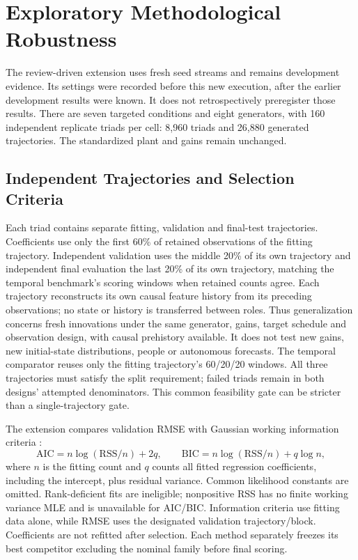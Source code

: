 \section{Exploratory Methodological Robustness}

The review-driven extension uses fresh seed streams and remains development evidence. Its settings were recorded before this new execution, after the earlier development results were known. It does not retrospectively preregister those results. There are seven targeted conditions and eight generators, with 160 independent replicate triads per cell: 8,960 triads and 26,880 generated trajectories. The standardized plant and gains remain unchanged.

\subsection{Independent Trajectories and Selection Criteria}

Each triad contains separate fitting, validation and final-test trajectories. Coefficients use only the first 60\% of retained observations of the fitting trajectory. Independent validation uses the middle 20\% of its own trajectory and independent final evaluation the last 20\% of its own trajectory, matching the temporal benchmark's scoring windows when retained counts agree. Each trajectory reconstructs its own causal feature history from its preceding observations; no state or history is transferred between roles. Thus generalization concerns fresh innovations under the same generator, gains, target schedule and observation design, with causal prehistory available. It does not test new gains, new initial-state distributions, people or autonomous forecasts. The temporal comparator reuses only the fitting trajectory's 60/20/20 windows. All three trajectories must satisfy the split requirement; failed triads remain in both designs' attempted denominators. This common feasibility gate can be stricter than a single-trajectory gate.

The extension compares validation RMSE with Gaussian working information criteria \parencite{akaike1974newlook,schwarz1978dimension}:
\[
\mathrm{AIC}=n\log(\mathrm{RSS}/n)+2q,
\qquad
\mathrm{BIC}=n\log(\mathrm{RSS}/n)+q\log n,
\]
where $n$ is the fitting count and $q$ counts all fitted regression coefficients, including the intercept, plus residual variance. Common likelihood constants are omitted. Rank-deficient fits are ineligible; nonpositive RSS has no finite working variance MLE and is unavailable for AIC/BIC. Information criteria use fitting data alone, while RMSE uses the designated validation trajectory/block. Coefficients are not refitted after selection. Each method separately freezes its best competitor excluding the nominal family before final scoring.

